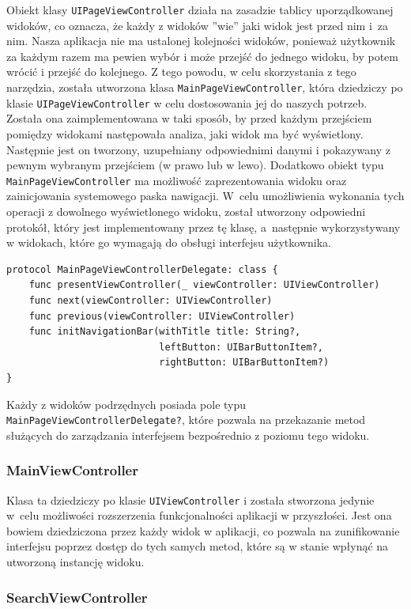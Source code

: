 \documentclass[twoside]{projektInzynierskiMS}
\begin{document}
Obiekt klasy \verb`UIPageViewController` działa na zasadzie tablicy uporządkowanej widoków, co oznacza, że każdy z widoków ''wie'' jaki widok jest przed nim i~za nim. Nasza aplikacja nie ma ustalonej kolejności widoków, ponieważ użytkownik za każdym razem ma pewien wybór i może przejść do jednego widoku, by potem wrócić i przejść do kolejnego. Z tego powodu, w celu skorzystania z tego narzędzia, została utworzona klasa \verb`MainPageViewController`, która dziedziczy po klasie \verb`UIPageViewController` w celu dostosowania jej do naszych potrzeb. Została ona zaimplementowana w taki sposób, by przed każdym przejściem pomiędzy widokami następowała analiza, jaki widok ma być wyświetlony. Następnie jest on tworzony, uzupełniany odpowiednimi danymi i pokazywany z pewnym wybranym przejściem (w prawo lub w lewo). Dodatkowo obiekt typu \verb`MainPageViewController` ma możliwość zaprezentowania widoku oraz zainicjowania systemowego paska nawigacji. W~celu umożliwienia wykonania tych operacji z dowolnego wyświetlonego widoku, został utworzony odpowiedni protokół, który jest implementowany przez tę klasę, a~następnie wykorzystywany w widokach, które go wymagają do obsługi interfejsu użytkownika.
\begin{verbatim}
protocol MainPageViewControllerDelegate: class {
    func presentViewController(_ viewController: UIViewController)
    func next(viewController: UIViewController)
    func previous(viewController: UIViewController)
    func initNavigationBar(withTitle title: String?,
                           leftButton: UIBarButtonItem?,
   	                       rightButton: UIBarButtonItem?)
}
\end{verbatim}
Każdy z widoków podrzędnych posiada pole typu \verb`MainPageViewControllerDelegate?`, które pozwala na przekazanie metod służących do zarządzania interfejsem bezpośrednio z poziomu tego widoku.


\subsubsection{MainViewController}

Klasa ta dziedziczy po klasie \verb`UIViewController` i została stworzona jedynie w~celu możliwości rozszerzenia funkcjonalności aplikacji w przyszłości. Jest ona bowiem dziedziczona przez każdy widok w aplikacji, co pozwala na zunifikowanie interfejsu poprzez dostęp do tych samych metod, które są w stanie wpłynąć na utworzoną instancję widoku.


\subsubsection{SearchViewController}
\end{document}
